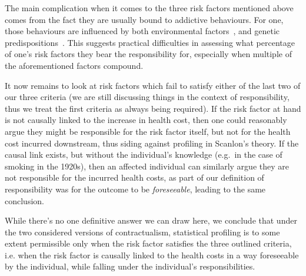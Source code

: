 

The main complication when it comes to the three risk factors mentioned above comes from the fact they are usually bound to addictive behaviours. For one, those behaviours are influenced by both environmental factors~\cite{agrawal-gen-addict}, and genetic predispositions~\cite{schizo-addict}. This suggests practical difficulties in assessing what percentage of one's risk factors they bear the responsibility for, especially when multiple of the aforementioned factors compound.

It now remains to look at risk factors which fail to satisfy either of the last two of our three criteria (we are still discussing things in the context of responsibility, thus we treat the first criteria as always being required). If the risk factor at hand is not causally linked to the increase in health cost, then one could reasonably argue they might be responsible for the risk factor itself, but not for the health cost incurred downstream, thus siding against profiling in Scanlon's theory. If the causal link exists, but without the individual's knowledge (e.g.~in the case of smoking in the 1920s), then an affected individual can similarly argue they are not responsible for the incurred health costs, as part of our definition of responsibility was for the outcome to be \emph{foreseeable}, leading to the same conclusion.

While there's no one definitive answer we can draw here, we conclude that under the two considered versions of contractualism, statistical profiling is to some extent permissible only when the risk factor satisfies the three outlined criteria, i.e. when the risk factor is causally linked to the health costs in a way foreseeable by the individual, while falling under the individual's responsibilities.
